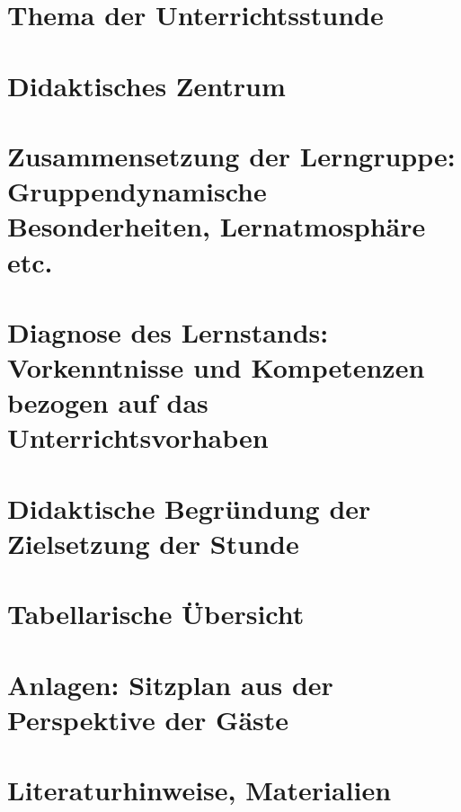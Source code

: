 \documentclass{kurzentwurf}
\begin{document}
\maketitle

\section{Thema der Unterrichtsstunde}


\section*{Didaktisches Zentrum}
\section{Zusammensetzung der Lerngruppe: Gruppendynamische Besonderheiten, Lernatmosphäre etc.}
\section{Diagnose des Lernstands: Vorkenntnisse und Kompetenzen bezogen auf das Unterrichtsvorhaben}
\section{Didaktische Begründung der Zielsetzung der Stunde}

\section{Tabellarische Übersicht}

\section{Anlagen: Sitzplan aus der Perspektive der Gäste}
\section*{Literaturhinweise, Materialien}


\pagebreak
\printbibliography[title={Literatur}]
\end{document}

